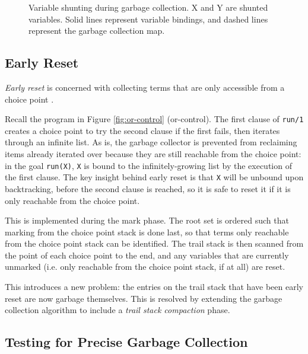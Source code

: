 \begin{enumerate}
\begin{figure}[H]
\caption{Variable shunting during garbage collection. X and Y are shunted variables. Solid lines represent variable bindings, and dashed lines represent the garbage collection map.}
\label{fig:shunt-cases}
\end{figure}

\end{enumerate}

\subsection{Early Reset}

\emph{Early reset} is concerned with collecting terms that are only accessible from a choice point \cite{applebyGarbargecollectionProlog1988}.

Recall the program in Figure \ref{fig:or-control} (or-control). The first clause of \texttt{run/1} creates a choice point to try the second clause if the first fails, then iterates through an infinite list. As is, the garbage collector is prevented from reclaiming items already iterated over because they are still reachable from the choice point: in the goal \texttt{run(X)}, \texttt{X} is bound to the infinitely-growing list by the execution of the first clause. The key insight behind early reset is that \texttt{X} will be unbound upon backtracking, before the second clause is reached, so it is safe to reset it if it is only reachable from the choice point.

This is implemented during the mark phase. The root set is ordered such that marking from the choice point stack is done last, so that terms only reachable from the choice point stack can be identified. The trail stack is then scanned from the point of each choice point to the end, and any variables that are currently unmarked (i.e. only reachable from the choice point stack, if at all) are reset.

This introduces a new problem: the entries on the trail stack that have been early reset are now garbage themselves. This is resolved by extending the garbage collection algorithm to include a \emph{trail stack compaction} phase.

\subsection{Testing for Precise Garbage Collection}

